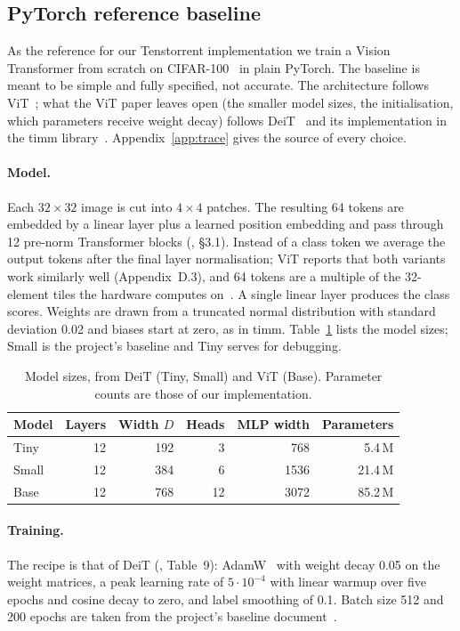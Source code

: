 \documentclass[10pt,a4paper]{article}
\begin{document}
\subsection*{PyTorch reference baseline}

As the reference for our Tenstorrent implementation we train a Vision Transformer from scratch on CIFAR-100~\cite{krizhevsky2009} in plain PyTorch. The baseline is meant to be simple and fully specified, not accurate. The architecture follows ViT~\cite{vit}; what the ViT paper leaves open (the smaller model sizes, the initialisation, which parameters receive weight decay) follows DeiT~\cite{deit} and its implementation in the timm library~\cite{timm}. Appendix~\ref{app:trace} gives the source of every choice.

\paragraph{Model.}
Each $32\times32$ image is cut into $4\times4$ patches. The resulting 64 tokens are embedded by a linear layer plus a learned position embedding and pass through 12 pre-norm Transformer blocks (\cite{vit}, \S3.1). Instead of a class token we average the output tokens after the final layer normalisation; ViT reports that both variants work similarly well (Appendix~D.3), and 64 tokens are a multiple of the 32-element tiles the hardware computes on~\cite{baselinepdf}. A single linear layer produces the class scores. Weights are drawn from a truncated normal distribution with standard deviation 0.02 and biases start at zero, as in timm. Table~\ref{tab:models} lists the model sizes; Small is the project's baseline and Tiny serves for debugging.

\begin{table}[h]
\centering
\begin{tabular}{lrrrrr}
\toprule
Model & Layers & Width $D$ & Heads & MLP width & Parameters \\
\midrule
Tiny  & 12 & 192 &  3 &  768 &  5.4\,M \\
Small & 12 & 384 &  6 & 1536 & 21.4\,M \\
Base  & 12 & 768 & 12 & 3072 & 85.2\,M \\
\bottomrule
\end{tabular}
\caption{Model sizes, from DeiT (Tiny, Small) and ViT (Base). Parameter counts are those of our implementation.}
\label{tab:models}
\end{table}

\paragraph{Training.}
The recipe is that of DeiT (\cite{deit}, Table~9): AdamW~\cite{adamw} with weight decay 0.05 on the weight matrices, a peak learning rate of $5\cdot10^{-4}$ with linear warmup over five epochs and cosine decay to zero, and label smoothing of 0.1. Batch size 512 and 200 epochs are taken from the project's baseline document~\cite{baselinepdf}.
\end{document}
